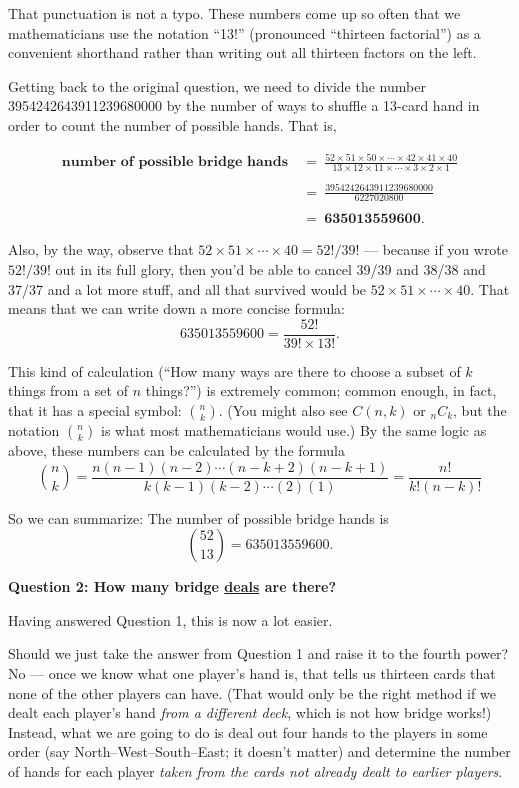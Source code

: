\documentclass{amsart}
\numberwithin{equation}{section}
\newcommand{\x}{\times}
\begin{document}
That punctuation is not a typo.  These numbers come up so often that we 
mathematicians use the notation ``13!'' (pronounced ``thirteen 
factorial'') as a convenient shorthand rather than writing out all 
thirteen factors on the left.

Getting back to the original question, we need to divide
the number 3954242643911239680000 by the number of ways to shuffle a 
13-card hand in order to count the number of possible hands.  That is,

\boldmath
\begin{align*}
\textbf{number of possible bridge hands} ~&=~ \frac{52\x51\x50\x\cdots\x42\x41\x40}{13\x12\x11\x\cdots\x3\x2\x1}\\\\
&=~ \frac{3954242643911239680000}{6227020800}\\\\
&=~ \mathbf{635013559600}.
\end{align*}
\unboldmath

Also, by the way, observe that $52\x51\x\cdots\x40=52!/39!$ --- because if you wrote $52!/39!$ out in its full glory, then
you'd be able to cancel 39/39 and 38/38 and 37/37 and a lot more stuff, and all that survived would be $52\x51\x\cdots\x40$.
That means that we can write down a more concise formula:
$$635013559600 =  \frac{52!}{39! \x 13!}.$$

This kind of calculation (``How many ways are there to choose a subset of $k$ things from a set of $n$ things?'') is extremely
common; common enough, in fact, that it has a special symbol: $\binom{n}{k}$.  (You might also see $C(n,k)$ or ${}_nC_k$,
but the notation $\binom{n}{k}$ is what most mathematicians would use.)  By the same logic as above, these numbers can be
calculated by the formula
$$\binom{n}{k} = \frac{n(n-1)(n-2)\cdots(n-k+2)(n-k+1)}{k(k-1)(k-2)\cdots(2)(1)} = \frac{n!}{k!(n-k)!}$$

So we can summarize: The number of possible bridge hands is
$$\binom{52}{13} = 635013559600.$$

\textbf{Question 2: How many bridge \underline{deals} are there?}

Having answered Question 1, this is now a lot easier.  

Should we just take the answer from Question 1 and raise it to the fourth power?  No --- once we know what one player's hand is, that tells us thirteen cards that none of the other players can have.  (That would only be the right method if we dealt each player's hand \textit{from a different deck}, which is not how bridge works!)
Instead, what we are going to do is deal out four hands to the players in some order (say North--West--South--East; it doesn't matter) and determine the number of hands for each player \emph{taken from the cards not already dealt to earlier players}.
\end{document}
